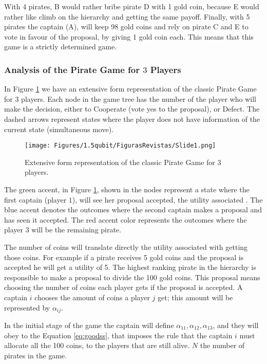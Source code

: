 With 4 pirates, B would rather bribe pirate D with 1 gold coin, because E would rather like climb on the hierarchy and getting the same payoff. Finally, with 5 pirates the captain (A), will keep 98 gold coins and rely on pirate C and E to vote in favour of the proposal, by giving 1 gold coin each. This means that this game is a strictly determined game.

\subsubsection{Analysis of the Pirate Game for $3$ Players}
\label{subsubsec:analysis_PG3players}

In Figure \ref{fig:pg_architecturegametree:extensiveform} we have an extensive form representation of the classic Pirate Game for $3$ players. Each node in the game tree has the number of the player who will make the decision, either to Cooperate (vote yes to the proposal), or Defect. The dashed arrows represent states where the player does not have information of the current state (simultaneous move). 

\begin{figure}[h]
\centering 
\texttt{[image: Figures/1.5qubit/FigurasRevistas/Slide1.png]}
\caption{Extensive form representation of the classic Pirate Game for $3$ players. }
\label{fig:pg_architecturegametree:extensiveform}
\end{figure}

The green accent, in Figure \ref{fig:pg_architecturegametree:extensiveform}, shown in the nodes represent a state where the first captain (player $1$), will see her proposal accepted, the utility associated . The blue accent denotes the outcomes where the second captain makes a proposal and has seen it accepted. The red accent color represents the outcomes where the player $3$ will be the remaining pirate.

The number of coins will translate directly the utility associated with getting those coins. For example if a pirate receives 5 gold coins and the proposal is accepted he will get a utility of 5. The highest ranking pirate in the hierarchy is responsible to make a proposal to divide the 100 gold coins. This proposal means choosing the number of coins each player gets if the proposal is accepted. A captain $i$ chooses the amount of coins a player $j$ get; this amount will be represented by $\alpha_{ij}$.

In the initial stage of the game the captain will define $\alpha_{11}, \alpha_{12}, \alpha_{13}$, and they will obey to the Equation \ref{eq:goodss}, that imposes the rule that the captain $i$ must allocate all the 100 coins, to the players that are still alive. $N$ the number of pirates in the game. 

